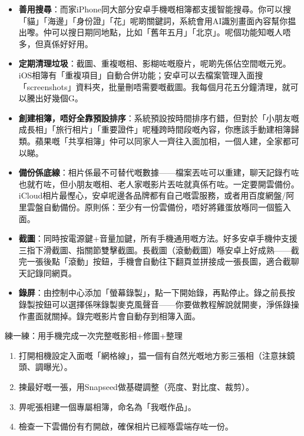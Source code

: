 \begin{itemize}
  \item \textbf{善用搜尋}：而家iPhone同大部分安卓手機嘅相簿都支援智能搜尋。你可以搜「貓」「海邊」「身份證」「花」呢啲關鍵詞，系統會用AI識別畫面內容幫你揾出嚟。仲可以搜日期同地點，比如「舊年五月」「北京」。呢個功能知嘅人唔多，但真係好好用。
  \item \textbf{定期清理垃圾}：截圖、重複嘅相、影糊咗嘅廢片，呢啲先係佔空間嘅元兇。iOS相簿有「重複項目」自動合併功能；安卓可以去檔案管理入面搜「screenshots」資料夾，批量刪唔需要嘅截圖。我每個月花五分鐘清理，就可以騰出好幾個G。
  \item \textbf{創建相簿，唔好全靠預設排序}：系統預設按時間排序冇錯，但對於「小朋友嘅成長相」「旅行相片」「重要證件」呢種跨時間段嘅內容，你應該手動建相簿歸類。蘋果嘅「共享相簿」仲可以同家人一齊往入面加相，一個人建，全家都可以睇。
  \item \textbf{備份係底線}：相片係最不可替代嘅數據——檔案丟咗可以重建，聊天記錄冇咗也就冇咗，但小朋友嘅相、老人家嘅影片丟咗就真係冇咗。一定要開雲備份。iCloud相片最慳心，安卓呢邊各品牌都有自己嘅雲服務，或者用百度網盤/阿里雲盤自動備份。原則係：至少有一份雲備份，唔好將雞蛋放喺同一個籃入面。
\end{itemize}


\begin{itemize}
  \item \textbf{截圖}：同時按電源鍵+音量加鍵，所有手機通用嘅方法。好多安卓手機仲支援三指下滑截圖、指關節雙擊截圖。長截圖（滾動截圖）喺安卓上好成熟——截完一張後點「滾動」按鈕，手機會自動往下翻頁並拼接成一張長圖，適合截聊天記錄同網頁。
  \item \textbf{錄屏}：由控制中心添加「螢幕錄製」，點一下開始錄，再點停止。錄之前長按錄製按鈕可以選擇係咪錄製麥克風聲音——你要做教程解說就開麥，淨係錄操作畫面就關掉。錄完嘅影片會自動存到相簿入面。
\end{itemize}

\begin{tcbpractice}{練一練：用手機完成一次完整嘅影相+修圖+整理}
\begin{enumerate}
  \item 打開相機設定入面嘅「網格線」，揾一個有自然光嘅地方影三張相（注意抹鏡頭、調曝光）。
  \item 揀最好嘅一張，用Snapseed做基礎調整（亮度、對比度、裁剪）。
  \item 畀呢張相建一個專屬相簿，命名為「我嘅作品」。
  \item 檢查一下雲備份有冇開啟，確保相片已經喺雲端存咗一份。
\end{enumerate}

\end{tcbpractice}
